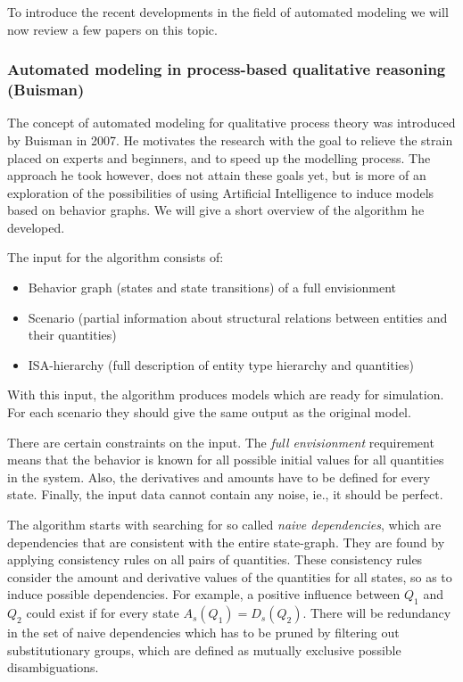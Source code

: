 \documentclass{article} %
\begin{document}
To introduce the recent developments in the field of automated modeling we
will now review a few papers on this topic.

\subsubsection{Automated modeling in process-based qualitative reasoning
(Buisman)}

The concept of automated modeling for qualitative process theory was
introduced by Buisman \cite{buisman} in 2007. He motivates the research with
the goal to relieve the strain placed on experts and beginners, and to speed
up the modelling process. The approach he took however, does not attain these
goals yet, but is more of an exploration of the possibilities of using
Artificial Intelligence to induce models based on behavior graphs. We will
give a short overview of the algorithm he developed.

The input for the algorithm consists of:

\begin{itemize}

\item Behavior graph (states and state transitions) of a full envisionment

\item Scenario (partial information about structural relations between entities and their quantities)

\item ISA-hierarchy (full description of entity type hierarchy and quantities)

\end{itemize}

With this input, the algorithm produces models which are ready for simulation.
For each scenario they should give the same output as the original model.

There are certain constraints on the input. The \emph{full envisionment}
requirement means that the behavior is known for all possible initial values
for all quantities in the system. Also, the derivatives and amounts have to be
defined for every state. Finally, the input data cannot contain any noise,
ie., it should be perfect.

The algorithm starts with searching for so called \emph{naive dependencies},
which are dependencies that are consistent with the entire state-graph. They
are found by applying consistency rules on all pairs of quantities. These
consistency rules consider the amount and derivative values of the quantities
for all states, so as to induce possible dependencies. For example, a positive
influence between $Q_1$ and $Q_2$ could exist if for every state $A_s(Q_1) =
D_s(Q_2)$.  There will be redundancy in the set of naive dependencies which
has to be pruned by filtering out substitutionary groups, which are defined as
mutually exclusive possible disambiguations. 
\end{document}
